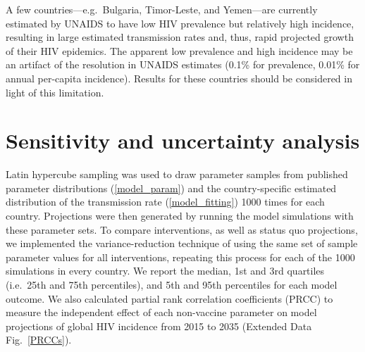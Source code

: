 \documentclass{article}
\begin{document}
A few countries—e.g.~Bulgaria, Timor-Leste, and Yemen—are currently
estimated by UNAIDS to have low HIV prevalence but relatively high
incidence, resulting in large estimated transmission rates and, thus,
rapid projected growth of their HIV epidemics. The apparent low
prevalence and high incidence may be an artifact of the resolution in
UNAIDS estimates (0.1\% for prevalence, 0.01\% for annual per-capita
incidence).  Results for these countries should be considered in light
of this limitation.


\section{Sensitivity and uncertainty analysis}
\label{uncertainty}

Latin hypercube sampling\cite{blower1994} was used to draw parameter
samples from published parameter distributions (\autoref{model_param})
and the country-specific estimated distribution of the transmission
rate (\autoref{model_fitting}) 1000 times for each country.
Projections were then generated by running the model simulations with
these parameter sets.  To compare interventions, as well as status quo
projections, we implemented the variance-reduction technique of using
the same set of sample parameter values for all interventions,
repeating this process for each of the 1000 simulations in every
country.\cite{shechter2006}  We report the median, 1st and 3rd
quartiles (i.e.~25th and 75th percentiles), and 5th and 95th
percentiles for each model outcome.  We also calculated partial rank
correlation coefficients (PRCC)\cite{blower1994} to measure the
independent effect of each non-vaccine parameter on model projections
of global HIV incidence from 2015 to 2035 (Extended Data
Fig.~\ref*{PRCCs}).
\end{document}
